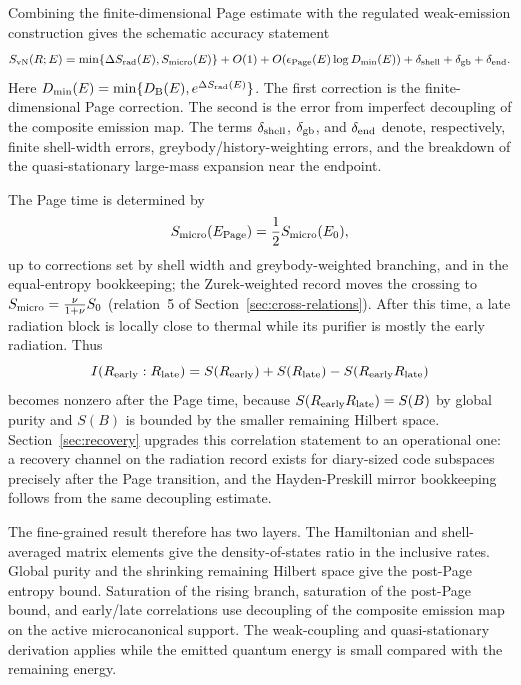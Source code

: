 \documentclass[12pt]{article}
\newcommand{\Smicro}{S_{\rm micro}}
\begin{document}
Combining the finite-dimensional Page estimate with the regulated
weak-emission construction gives the schematic accuracy statement
\begin{equation}
    S_{\rm vN}(R;E)
    =
    \min\{\Delta S_{\rm rad}(E),\Smicro(E)\}
    +O(1)
    +O\!\left(\epsilon_{\rm Page}(E)\log D_{\rm min}(E)\right)
    +\delta_{\rm shell}+\delta_{\rm gb}+\delta_{\rm end}.
\end{equation}
Here $D_{\rm min}(E)=\min\{D_{\rm B}(E),e^{\Delta S_{\rm rad}(E)}\}$.
The first correction is the finite-dimensional Page correction.  The second is
the error from imperfect decoupling of the composite emission map.  The terms
$\delta_{\rm shell}$, $\delta_{\rm gb}$, and $\delta_{\rm end}$ denote,
respectively, finite shell-width errors, greybody/history-weighting errors,
and the breakdown of the quasi-stationary large-mass expansion near the
endpoint.

The Page time is determined by
\begin{equation}
    \Smicro(E_{\rm Page})
    =
    \frac12\Smicro(E_0),
\end{equation}
up to corrections set by shell width and greybody-weighted branching, and
in the equal-entropy bookkeeping; the Zurek-weighted record moves the
crossing to $\Smicro=\frac{\nu}{1+\nu}S_0$ (relation~5 of
Section~\ref{sec:cross-relations}).  After
this time, a late radiation block is locally close to thermal while its
purifier is mostly the early radiation.  Thus
\begin{equation}
    I(R_{\rm early}:R_{\rm late})
    =
    S(R_{\rm early})+S(R_{\rm late})-S(R_{\rm early}R_{\rm late})
\end{equation}
becomes nonzero after the Page time, because
$S(R_{\rm early}R_{\rm late})=S(B)$ by global purity and $S(B)$ is bounded by
the smaller remaining Hilbert space.  Section~\ref{sec:recovery} upgrades
this correlation statement to an operational one: a recovery channel on the
radiation record exists for diary-sized code subspaces precisely after the
Page transition, and the Hayden-Preskill mirror bookkeeping follows from the
same decoupling estimate.

The fine-grained result therefore has two layers.  The Hamiltonian and
shell-averaged matrix elements give the density-of-states ratio in the
inclusive rates.  Global purity and the shrinking remaining Hilbert space give
the post-Page entropy bound.  Saturation of the rising branch, saturation of
the post-Page bound, and early/late correlations use decoupling of the
composite emission map on the active microcanonical support.  The weak-coupling
and quasi-stationary derivation applies while the emitted quantum energy is
small compared with the remaining energy.
\end{document}
